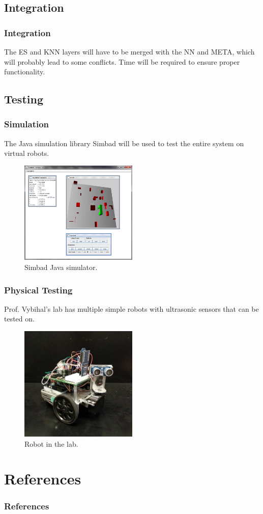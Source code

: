 \documentclass{beamer}
\begin{document}
	\subsection{Integration}
	
	\begin{frame}
		\frametitle{Integration}
		The ES and KNN layers will have to be merged with the NN and META, which will probably lead to some conflicts. Time will be required to ensure proper functionality.
	\end{frame}

	\subsection{Testing}
	
	\begin{frame}
		\frametitle{Simulation}
		The Java simulation library Simbad will be used to test the entire system on virtual robots.
		\begin{figure}
			\centering
			\includegraphics[width=0.5\textwidth]{figures/simbad.png}
			\caption
			{Simbad Java simulator. }
			\label{fig:simbad}
		\end{figure}
	\end{frame}

	\begin{frame}
		\frametitle{Physical Testing}
		Prof. Vybihal's lab has multiple simple robots with ultrasonic sensors that can be tested on.
		\begin{figure}
			\centering
			\includegraphics[width=0.5\textwidth]{figures/robot.jpg}
			\caption
			{Robot in the lab.}
			\label{fig:robot}
		\end{figure}
	\end{frame}
	
	\section{References}
	\begin{frame}[t,allowframebreaks]
		\frametitle{References}
		\printbibliography
	\end{frame}
	
\end{document}
